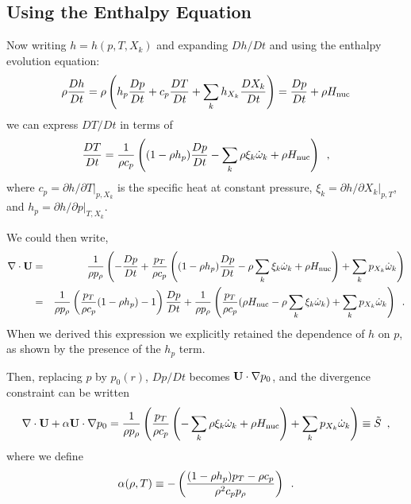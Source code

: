 \subsection{Using the Enthalpy Equation}

Now writing $h = h(p,T,X_k)$ and expanding $Dh/Dt$ and using the
enthalpy evolution equation:
\begin{equation}
\rho \frac{D h}{Dt}  = \rho \left( h_p \frac{D p}{Dt} + c_p \frac{D T}{Dt} + \sum_k h_{X_k} \frac{D X_k}{Dt} \right)
                     = \frac{D p}{D t} + \rho {H_{\rm nuc}}
\end{equation}
we can express $DT/Dt$ in terms of 
\begin{equation}
\frac{DT}{Dt} = \frac{1}{\rho c_p} \left( (1 - \rho h_p) \frac{D p}{D t}
- \sum_k \rho \xi_k \dot{\omega}_k + \rho {H_{\rm nuc}} \right) \enskip , \label{eq:dTdt}
\end{equation}
where $c_p = \left.\partial h/\partial T\right|_{p,X_k}$ is the
specific heat at constant pressure,
$\xi_k = \left.\partial h/\partial X_k \right|_{p,T}$,
and $h_p = \left.\partial h/\partial p\right|_{T,X_k}.$

We could then write,
\begin{eqnarray*}
\nabla \cdot {\bf U} &=& \frac{1}{\rho p_\rho} \left(
- \frac{D p}{D t} + \frac{p_T}{\rho c_p}
  \left( (1 - \rho h_p) \frac{D p}{D t} - \rho \sum_k \xi_k \dot{\omega}_k + \rho {H_{\rm nuc}} \right)
+ \sum_k p_{X_k} \dot{\omega}_k \right)  \\
                 &=& \frac{1}{\rho p_\rho}
  \left( \frac{p_T}{\rho c_p}(1  - \rho h_p) - 1 \right) \frac{D p}{D t}
 + \frac{1}{\rho p_\rho} \left(
  \frac{p_T}{\rho c_p} (\rho {H_{\rm nuc}} - \rho \sum_k \xi_k   \dot{\omega}_k)
                               + \sum_k p_{X_k} \dot{\omega}_k \right) \enskip .
\end{eqnarray*}
When we derived this expression we explicitly retained the dependence
of $h$ on $p$, as shown by the presence of the $h_p$ term.

Then, replacing $p$ by $p_0(r)$, $Dp/Dt$ becomes ${\bf U} \cdot
\nabla p_0$, and the divergence constraint can be written
\begin{equation}
\nabla \cdot {\bf U} + \alpha {\bf U} \cdot \nabla p_0 =
\frac{1}{\rho p_\rho} \left(
   \frac{p_T}{\rho c_p} \left(
  - \sum_k\rho  \xi_k \dot{\omega}_k + \rho {H_{\rm nuc}} \right)
 + \sum_k p_{X_k} \dot{\omega}_k \right)  \equiv \tilde{S} \enskip \label{eq:full_divu_constraint} ,
\end{equation}
where we define
\begin{equation}
\alpha(\rho,T) \equiv - \left( \frac{(1 - \rho h_p )p_T - \rho c_p}{\rho^2
  c_p p_\rho} \right) \enskip . \label{eq:alphadef}
\end{equation}

